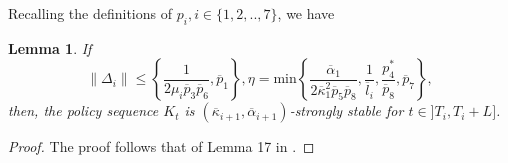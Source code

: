\documentclass[letterpaper, 10 pt, conference]{ieeeconf}  %
\newtheorem{lemma}{Lemma}
\begin{document}
Recalling the definitions of $p_i, i\in \{1,2,..,7\}$, we have
\begin{lemma}
\label{seq_str_stab}
If 
\begin{equation}
\label{conditions}
    \|\Delta_i\| \leq \left\{ \frac{1}{2\mu_i \overline{p}_3 \overline{p}_6}, \overline{p}_1 \right\}, \eta = \text{min} \left\{ \frac{\overline{\alpha}_1}{2\overline{\kappa}_1^2\overline{p}_5  \overline{p}_{8}}, \frac{1}{\overline{l}_i}, \frac{p^*_4}{\overline{p}_{8}}, \overline{p}_7 \right\},
\end{equation}
then, the policy sequence $K_t$ is \((\overline{\kappa}_{i+1}, \overline{\alpha}_{i+1})\)-strongly stable for $t \in ]T_i, T_i+L]$.   
\end{lemma}  \vspace{2mm}  
\begin{proof}
    The proof follows that of Lemma 17 in \cite{zhao2025policy}.
\end{proof}
\end{document}
